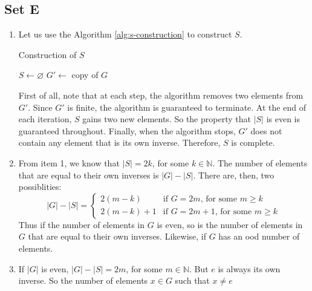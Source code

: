 \documentclass{article}
\let\emptyset\varnothing
\begin{document}
\subsection{Set E}
\begin{enumerate}
    \item Let us use the Algorithm \ref{alg:s-construction} to construct $S$.
        \begin{algorithm}[H]
            \caption{Construction of $S$}\label{alg:s-construction}
            \begin{algorithmic}[1]
                \Procedure{}{}
                \State $S \leftarrow \emptyset$
                \State $G' \leftarrow$ copy of $G$
                \EndWhile
                \EndProcedure
            \end{algorithmic}
        \end{algorithm}
        First of all, note that at each step, the algorithm removes two elements from $G'$. Since $G'$ is finite, the algorithm is guaranteed to terminate.
        At the end of each iteration, $S$ gains two new elements. So the property that $|S|$ is even is guaranteed throughout. Finally, when the algorithm stops,
        $G'$ does not contain any element that is its own inverse. Therefore, $S$ is complete.
    \item From item 1, we know that $|S| = 2k$, for some $k \in \mathbb{N}$. The number of elements that are equal to their own inverses is $|G| - |S|$. There are, then,
        two possiblities:
        \begin{equation*}
            |G| - |S| =
            \begin{cases}
                2(m - k)     & \text{if $G = 2m$, for some $m \geqslant k$}\\ 
                2(m - k) + 1 & \text{if $G = 2m + 1$, for some $m \geqslant k$}
            \end{cases}
        \end{equation*}
        Thus if the number of elements in $G$ is even, so is the number of elements in $G$ that are equal to their own inverses. Likewise, if $G$ has an ood number of elements.
    \item If $|G|$ is even, $|G| - |S| = 2m$, for some $m \in \mathbb{N}$. But $e$ is always its own inverse. So the number of elements $x \in G$ such that $x \ne e$

\end{enumerate}
\end{document}
